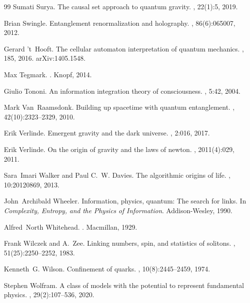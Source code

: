 \begin{thebibliography}{99}
Sumati Surya.
\newblock The causal set approach to quantum gravity.
, 22(1):5, 2019.

Brian Swingle.
\newblock Entanglement renormalization and holography.
, 86(6):065007, 2012.

Gerard 't~Hooft.
\newblock The cellular automaton interpretation of quantum mechanics.
, 185, 2016.
\newblock arXiv:1405.1548.

Max Tegmark.
.
\newblock Knopf, 2014.

Giulio Tononi.
\newblock An information integration theory of consciousness.
, 5:42, 2004.

Mark Van~Raamsdonk.
\newblock Building up spacetime with quantum entanglement.
, 42(10):2323--2329, 2010.

Erik Verlinde.
\newblock Emergent gravity and the dark universe.
, 2:016, 2017.

Erik Verlinde.
\newblock On the origin of gravity and the laws of newton.
, 2011(4):029, 2011.

Sara~Imari Walker and Paul C.~W. Davies.
\newblock The algorithmic origins of life.
, 10:20120869, 2013.

John~Archibald Wheeler.
\newblock Information, physics, quantum: The search for links.
\newblock In {\em Complexity, Entropy, and the Physics of Information}.
  Addison-Wesley, 1990.

Alfred~North Whitehead.
.
\newblock Macmillan, 1929.

Frank Wilczek and A.~Zee.
\newblock Linking numbers, spin, and statistics of solitons.
, 51(25):2250--2252, 1983.

Kenneth~G. Wilson.
\newblock Confinement of quarks.
, 10(8):2445--2459, 1974.

Stephen Wolfram.
\newblock A class of models with the potential to represent fundamental
  physics.
, 29(2):107--536, 2020.


\end{thebibliography}

